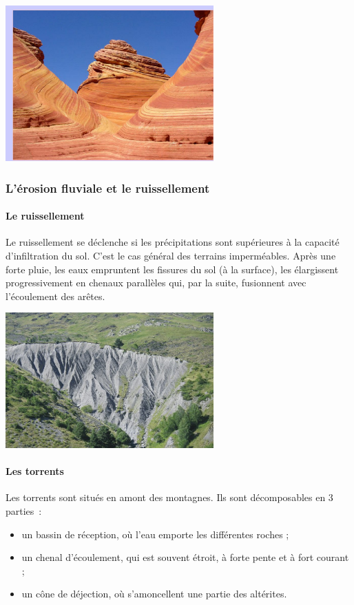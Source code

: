 \documentclass[a4paper,11pt]{article}
\begin{document}
\begin{center}
  \includegraphics[width=8cm]{Images/Erosion/erosion_eolienne.JPG}
\end{center}

\subsubsection{L'érosion fluviale et le ruissellement}

\paragraph{Le ruissellement}
\medbreak
Le ruissellement se déclenche si les précipitations sont supérieures à la capacité d'infiltration du sol. C'est le cas général des terrains imperméables. 
Après une forte pluie, les eaux empruntent les fissures du sol (à la surface), les élargissent progressivement en chenaux parallèles qui, par la suite, fusionnent avec l'écoulement des arêtes.

\begin{center}
  \includegraphics[width=8cm]{Images/Erosion/bad_lands.jpg}
\end{center}

\paragraph{Les torrents}
\medbreak
Les torrents sont situés en amont des montagnes.
Ils sont décomposables en 3 parties~:
\begin{itemize}
  \item un bassin de réception, où l'eau emporte les différentes roches ;
  \item un chenal d'écoulement, qui est souvent étroit, à forte pente et à fort courant ;
  \item un cône de déjection, où s'amoncellent une partie des altérites.
\end{itemize}
\end{document}
